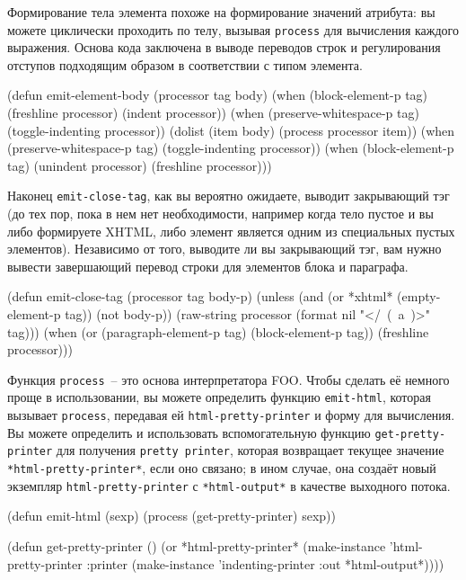 Формирование тела элемента похоже на формирование значений атрибута: вы можете циклически
проходить по телу, вызывая \lstinline{process} для вычисления каждого выражения. Основа кода
заключена в выводе переводов строк и регулирования отступов подходящим образом в
соответствии с типом элемента.

\begin{myverb}
(defun emit-element-body (processor tag body)
  (when (block-element-p tag)
    (freshline processor)
    (indent processor))
  (when (preserve-whitespace-p tag) (toggle-indenting processor))
  (dolist (item body)  (process processor item))
  (when (preserve-whitespace-p tag) (toggle-indenting processor))
  (when (block-element-p tag)
    (unindent processor)
    (freshline processor)))
\end{myverb}

Наконец \lstinline{emit-close-tag}, как вы вероятно ожидаете, выводит закрывающий тэг (до тех
пор, пока в нем нет необходимости, например когда тело пустое и вы либо формируете XHTML,
либо элемент является одним из специальных пустых элементов). Независимо от того, выводите
ли вы закрывающий тэг, вам нужно вывести завершающий перевод строки для элементов блока и
параграфа.

\begin{myverb}
(defun emit-close-tag (processor tag body-p)
  (unless (and (or *xhtml* (empty-element-p tag)) (not body-p))
    (raw-string processor (format nil "</~(~a~)>" tag)))
  (when (or (paragraph-element-p tag) (block-element-p tag))
    (freshline processor)))
\end{myverb}

Функция \lstinline{process}~-- это основа интерпретатора FOO. Чтобы сделать её немного проще в
использовании, вы можете определить функцию \lstinline{emit-html}, которая вызывает
\lstinline{process}, передавая ей \lstinline{html-pretty-printer} и форму для вычисления. Вы можете
определить и использовать вспомогательную функцию \lstinline{get-pretty-printer} для получения
\lstinline{pretty printer}, которая возвращает текущее значение \lstinline{*html-pretty-printer*},
если оно связано; в ином случае, она создаёт новый экземпляр \lstinline{html-pretty-printer} с
\lstinline{*html-output*} в качестве выходного потока.

\begin{myverb}
(defun emit-html (sexp) (process (get-pretty-printer) sexp))

(defun get-pretty-printer ()
  (or *html-pretty-printer*
      (make-instance 
       'html-pretty-printer
       :printer (make-instance 'indenting-printer :out *html-output*))))
\end{myverb}

